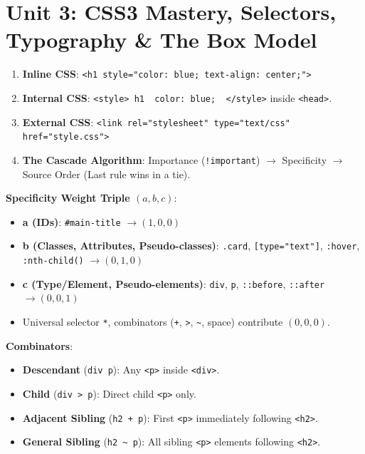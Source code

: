 \documentclass[a4paper,11pt]{article}
\begin{document}
\newpage
\section{Unit 3: CSS3 Mastery, Selectors, Typography \& The Box Model}

\begin{conceptbox}
\begin{enumerate}
    \item \textbf{Inline CSS}: \texttt{<h1 style="color: blue; text-align: center;">}
    \item \textbf{Internal CSS}: \texttt{<style> h1 { color: blue; } </style>} inside \texttt{<head>}.
    \item \textbf{External CSS}: \texttt{<link rel="stylesheet" type="text/css" href="style.css">}
    \item \textbf{The Cascade Algorithm}: Importance (\texttt{!important}) $\to$ Specificity $\to$ Source Order (Last rule wins in a tie).
\end{enumerate}
\end{conceptbox}

\begin{handwbox}
\textbf{Specificity Weight Triple $(a, b, c)$}:
\begin{itemize}[leftmargin=*]
    \item \textbf{a (IDs)}: \texttt{\#main-title} $\to (1, 0, 0)$
    \item \textbf{b (Classes, Attributes, Pseudo-classes)}: \texttt{.card}, \texttt{[type="text"]}, \texttt{:hover}, \texttt{:nth-child()} $\to (0, 1, 0)$
    \item \textbf{c (Type/Element, Pseudo-elements)}: \texttt{div}, \texttt{p}, \texttt{::before}, \texttt{::after} $\to (0, 0, 1)$
    \item Universal selector \texttt{*}, combinators (\texttt{+}, \texttt{>}, \texttt{\~{}}, space) contribute $(0, 0, 0)$.
\end{itemize}
\textbf{Combinators}:
\begin{itemize}[leftmargin=*]
    \item \textbf{Descendant} (\texttt{div p}): Any \texttt{<p>} inside \texttt{<div>}.
    \item \textbf{Child} (\texttt{div > p}): Direct child \texttt{<p>} only.
    \item \textbf{Adjacent Sibling} (\texttt{h2 + p}): First \texttt{<p>} immediately following \texttt{<h2>}.
    \item \textbf{General Sibling} (\texttt{h2 \~{} p}): All sibling \texttt{<p>} elements following \texttt{<h2>}.
\end{itemize}
\end{handwbox}
\end{document}
